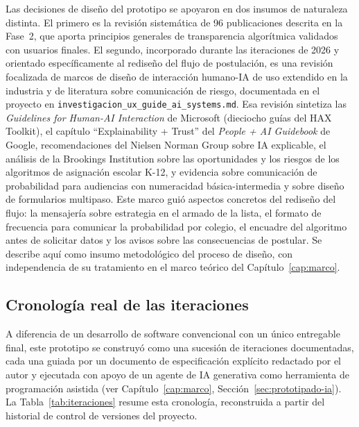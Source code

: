 Las decisiones de diseño del prototipo se apoyaron en dos insumos de naturaleza distinta. El primero es la revisión sistemática de 96 publicaciones descrita en la Fase~2, que aporta principios generales de transparencia algorítmica validados con usuarios finales. El segundo, incorporado durante las iteraciones de 2026 y orientado específicamente al rediseño del flujo de postulación, es una revisión focalizada de marcos de diseño de interacción humano-IA de uso extendido en la industria y de literatura sobre comunicación de riesgo, documentada en el proyecto en \texttt{investigacion\_ux\_guide\_ai\_systems.md}. Esa revisión sintetiza las \emph{Guidelines for Human-AI Interaction} de Microsoft (dieciocho guías del HAX Toolkit), el capítulo ``Explainability + Trust'' del \emph{People + AI Guidebook} de Google, recomendaciones del Nielsen Norman Group sobre IA explicable, el análisis de la Brookings Institution sobre las oportunidades y los riesgos de los algoritmos de asignación escolar K-12, y evidencia sobre comunicación de probabilidad para audiencias con numeracidad básica-intermedia y sobre diseño de formularios multipaso. Este marco guió aspectos concretos del rediseño del flujo: la mensajería sobre estrategia en el armado de la lista, el formato de frecuencia para comunicar la probabilidad por colegio, el encuadre del algoritmo antes de solicitar datos y los avisos sobre las consecuencias de postular. Se describe aquí como insumo metodológico del proceso de diseño, con independencia de su tratamiento en el marco teórico del Capítulo~\ref{cap:marco}.

\subsection{Cronología real de las iteraciones}

A diferencia de un desarrollo de software convencional con un único entregable final, este prototipo se construyó como una sucesión de iteraciones documentadas, cada una guiada por un documento de especificación explícito redactado por el autor y ejecutada con apoyo de un agente de IA generativa como herramienta de programación asistida (ver Capítulo~\ref{cap:marco}, Sección~\ref{sec:prototipado-ia}). La Tabla~\ref{tab:iteraciones} resume esta cronología, reconstruida a partir del historial de control de versiones del proyecto.

